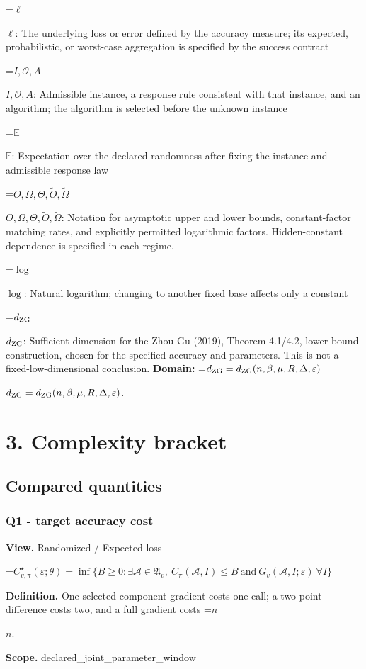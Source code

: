 \documentclass[10pt,a4paper]{article}
\newcommand{\AtlasMath}[1]{\par\begingroup\centering\setbox0=\hbox{$\displaystyle #1$}\ifdim\wd0>1.4\linewidth\typeout{ATLAS WIDE FORMULA: \the\wd0}\fi\ifdim\wd0>\linewidth\resizebox{\linewidth}{!}{\box0}\else\box0\fi\par\endgroup}
\newcommand{\AtlasInlineMath}[1]{\begingroup\setbox0=\hbox{$#1$}\ifdim\wd0>.4\linewidth\endgroup\AtlasMath{#1}\else\endgroup$#1$\fi}
\begin{document}
\AtlasInlineMath{\ell}: The underlying loss or error defined by the accuracy measure; its expected, probabilistic, or worst-case aggregation is specified by the success contract

\AtlasInlineMath{I,\mathcal{O},A}: Admissible instance, a response rule consistent with that instance, and an algorithm; the algorithm is selected before the unknown instance

\AtlasInlineMath{\mathbb{E}}: Expectation over the declared randomness after fixing the instance and admissible response law

\AtlasInlineMath{O,\Omega,\Theta,\widetilde{O},\widetilde\Omega}: Notation for asymptotic upper and lower bounds, constant-factor matching rates, and explicitly permitted logarithmic factors. Hidden-constant dependence is specified in each regime.

\AtlasInlineMath{\log}: Natural logarithm; changing to another fixed base affects only a constant

\AtlasInlineMath{d_{\rm ZG}}: Sufficient dimension for the Zhou-Gu (2019), Theorem 4.1/4.2, lower-bound construction, chosen for the specified accuracy and parameters. This is not a fixed-low-dimensional conclusion. \textbf{Domain:} \AtlasInlineMath{d_{\rm ZG}=d_{\rm ZG}(n,\beta,\mu,R,\Delta,\varepsilon)}.

\section{3. Complexity bracket}
\subsection{Compared quantities}
\subsubsection{Q1 - target accuracy cost}
\textbf{View.} Randomized / Expected loss

\AtlasMath{C^\star_{v,\pi}(\varepsilon;\theta)=\inf\{B\ge0:\exists\mathcal A\in\mathfrak A_v,\ C_\pi(\mathcal A,I)\le B\ \text{and}\ G_v(\mathcal A,I;\varepsilon)\ \forall I\}}
\textbf{Definition.} One selected-component gradient costs one call; a two-point difference costs two, and a full gradient costs \AtlasInlineMath{n}.

\textbf{Scope.} declared\_\allowbreak{}joint\_\allowbreak{}parameter\_\allowbreak{}window
\end{document}

